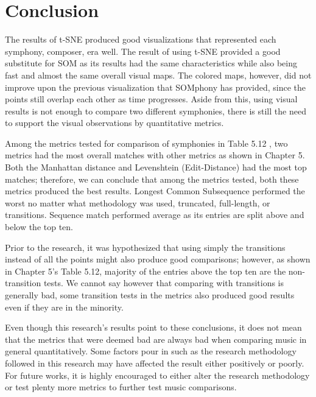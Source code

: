 %
%
%                 

\chapter{Conclusion}
The results of t-SNE produced good visualizations that represented each symphony, composer, era well. The result of using t-SNE provided a good substitute for SOM as its results had the same characteristics while also being fast and almost the same overall visual maps. The colored maps, however, did not improve upon the previous visualization that SOMphony has provided, since the points still overlap each other as time progresses. Aside from this, using visual results is not enough to compare two different symphonies, there is still the need to support the visual observations by quantitative metrics. 

Among the metrics tested for comparison of symphonies in Table 5.12 , two metrics had the most overall matches with other metrics as shown in Chapter 5. Both the Manhattan distance and Levenshtein (Edit-Distance) had the most top matches; therefore, we can conclude that among the metrics tested, both these metrics produced the best results. Longest Common Subsequence performed the worst no matter what methodology was used, truncated, full-length, or transitions. Sequence match performed average as its entries are split above and below the top ten.

Prior to the research, it was hypothesized that using simply the transitions instead of all the points might also produce good comparisons; however, as shown in Chapter 5’s Table 5.12, majority of the entries above the top ten are the non-transition tests. We cannot say however that comparing with transitions is generally bad, some transition tests in the metrics also produced good results even if they are in the minority.

Even though this research’s results point to these conclusions, it does not mean that the metrics that were deemed bad are always bad when comparing music in general quantitatively. Some  factors pour in such as the research methodology followed in this research may have affected the result either positively or poorly. For future works, it is highly encouraged to either alter the research methodology or test plenty more metrics to further test music comparisons.
